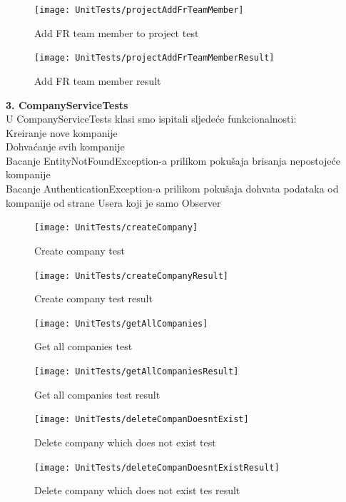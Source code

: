 			\begin{figure}[H]
				\texttt{[image: UnitTests/projectAddFrTeamMember]}
				\centering
				\caption{Add FR team member to project test}
				\label{fig:addFrTeamMemberTest}
			\end{figure}
			\begin{figure}[H]
				\texttt{[image: UnitTests/projectAddFrTeamMemberResult]}
				\centering
				\caption{Add FR team member result}
				\label{fig:addFrTeamMemberResult}
			\end{figure}

			\textbf{3. CompanyServiceTests\\}
			{U CompanyServiceTests klasi smo ispitali sljedeće funkcionalnosti:\\
				Kreiranje nove kompanije\\
				Dohvaćanje svih kompanije\\
				Bacanje EntityNotFoundException-a prilikom pokušaja brisanja nepostojeće kompanije\\
				Bacanje AuthenticationException-a prilikom pokušaja dohvata podataka od kompanije od strane Usera koji je samo Observer}
			
			\begin{figure}[H]
				\texttt{[image: UnitTests/createCompany]}
				\centering
				\caption{Create company test}
				\label{fig:createCompanyTest}
			\end{figure}
			\begin{figure}[H]
				\texttt{[image: UnitTests/createCompanyResult]}
				\centering
				\caption{Create company test result}
				\label{fig:createCompanyResult}
			\end{figure}

			\begin{figure}[H]
				\texttt{[image: UnitTests/getAllCompanies]}
				\centering
				\caption{Get all companies test}
				\label{fig:getAllCompaniesTest}
			\end{figure}
			\begin{figure}[H]
				\texttt{[image: UnitTests/getAllCompaniesResult]}
				\centering
				\caption{Get all companies test result}
				\label{fig:getAllCompaniesResult}
			\end{figure}

			\begin{figure}[H]
				\texttt{[image: UnitTests/deleteCompanDoesntExist]}
				\centering
				\caption{Delete company which does not exist test}
				\label{fig:deleteCompanyTest}
			\end{figure}
			\begin{figure}[H]
				\texttt{[image: UnitTests/deleteCompanDoesntExistResult]}
				\centering
				\caption{Delete company which does not exist tes result}
				\label{fig:deleteCompanyResult}
			\end{figure}


